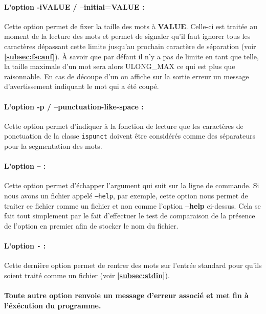 \documentclass{article}
\begin{document}
\paragraph{L'option -iVALUE / --initial=VALUE :}
Cette option permet de fixer la taille des mots à \textbf{VALUE}.
Celle-ci est traitée au moment de la lecture des mots et permet de signaler qu'il faut ignorer tous les caractères dépassant cette
limite jusqu'au prochain caractère de séparation (voir \textbf{\ref{subsec:fscanf}}). À savoir que par défaut il n'y a pas de limite en
tant que telle, la taille maximale d'un mot sera alors ULONG\_MAX ce qui est plus que raisonnable. En cas de découpe d'un on affiche sur la
sortie erreur un message d'avertissement indiquant le mot qui a été coupé.

\paragraph{L'option -p / --punctuation-like-space :}
Cette option permet d'indiquer à la fonction de lecture que les caractères de ponctuation de la classe \texttt{ispunct}
doivent être considérés comme des séparateurs pour la segmentation des mots.

\paragraph{L'option \texttt{--} :}
Cette option permet d'échapper l'argument qui suit sur la ligne de commande. Si nous avons un fichier appelé 
\texttt{--help}, par exemple, cette option nous permet de traiter ce fichier comme un fichier et non comme l'option \textbf{--help} ci-dessus.
Cela se fait tout simplement par le fait d'effectuer le test de comparaison de la présence de l'option en premier afin de stocker le nom du fichier.

\paragraph{L'option \texttt{-} :}
Cette dernière option permet de rentrer des mots sur l'entrée standard pour qu'ils soient traité comme un fichier (voir \textbf{\ref{subsec:stdin}}).

\paragraph{Toute autre option renvoie un message d'erreur associé et met fin à l'éxécution du programme.}
\end{document}
